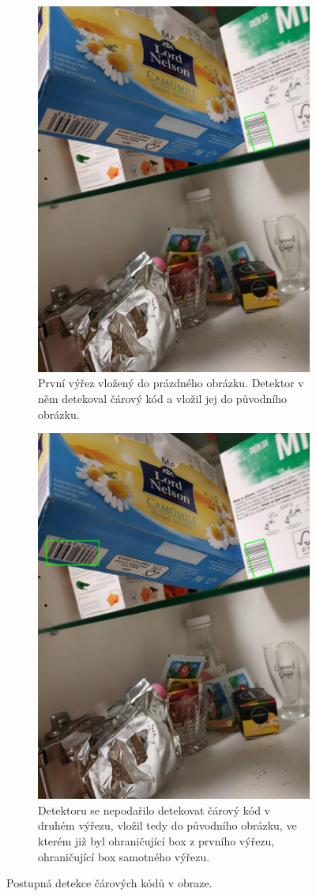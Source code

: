 \begin{figure}[htbp]
\begin{subfigure}{0.6\textwidth}
    \includegraphics[width=0.41\linewidth]{obrazky-figures/sub_final_1_merge_implement.jpg}\hfill
    \caption{První výřez vložený do prázdného obrázku. Detektor v něm detekoval čárový kód a vložil jej do původního obrázku.}
    \end{subfigure}
    \begin{subfigure}{0.6\textwidth}
    \hfill
    \includegraphics[width=0.41\linewidth]{obrazky-figures/sub_final_2_merge_implement.jpg}\hfill
    \caption{Detektoru se nepodařilo detekovat čárový kód v druhém výřezu, vložil tedy do původního obrázku, ve kterém již byl ohraničující box z prvního výřezu, ohraničující box samotného výřezu.}
    \end{subfigure}
    \caption{Postupná detekce čárových kódů v obraze.}
    \label{merge_implement}
\end{figure}
\clearpage

